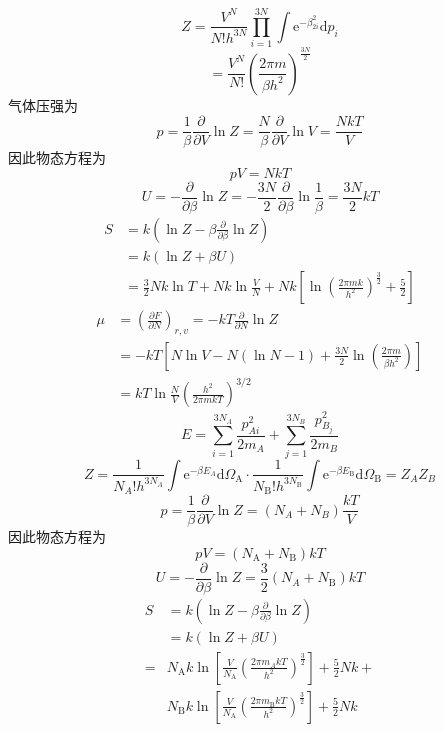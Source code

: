 \documentclass[UTF8,9pt]{ctexart}
\begin{document}
 $$Z 
=\frac{V^{N}}{N ! h^{3 N}} \prod_{i=1}^{3 N} \int \mathrm{e}^{-\beta_{2 i}^{2}} \mathrm{d} p_{i}
 $$$$ 
 =\frac{V^{N}}{N !}\left(\frac{2 \pi m}{\beta h^{2}}\right)^{\frac{3 N}{2}}
  $$
  气体压强为
  $$ 
p=\frac{1}{\beta} \frac{\partial}{\partial V} \ln Z=\frac{N}{\beta} \frac{\partial}{\partial V} \ln V=\frac{N k T}{V}
 $$因此物态方程为$$ 
 p V=N k T
  $$
  $$ 
U=-\frac{\partial}{\partial \beta} \ln Z=-\frac{3 N}{2} \frac{\partial}{\partial \beta} \ln \frac{1}{\beta}=\frac{3 N}{2} k T
 $$$$ 
\begin{aligned} S &=k\left(\ln Z-\beta \frac{\partial}{\partial \beta} \ln Z\right) \\ &=k(\ln Z+\beta U) \\ &=\frac{3}{2} N k \ln T+N k \ln \frac{V}{N}+N k\left[\ln \left(\frac{2 \pi m k}{h^{2}}\right)^{\frac{3}{2}}+\frac{5}{2}\right] \end{aligned}
 $$$$ 
\begin{aligned} \mu &=\left(\frac{\partial F}{\partial N}\right)_{r, v}=-k T \frac{\partial}{\partial N} \ln Z \\ &=-k T\left[N \ln V-N(\ln N-1)+\frac{3 N}{2} \ln \left(\frac{2 \pi m}{\beta h^{2}}\right)\right] \\ &=k T \ln \frac{N}{V}\left(\frac{h^{2}}{2 \pi m k T}\right)^{3 / 2} \end{aligned}
 $$
 $$ 
E=\sum_{i=1}^{3 N_{A}} \frac{p_{A i}^{2}}{2 m_{A}}+\sum_{j=1}^{3 N_{B}} \frac{p_{B_{j}}^{2}}{2 m_{B}}
 $$
 $$Z 
=\frac{1}{N_{A} ! h^{3 N_{A}}} \int \mathrm{e}^{-\beta E_{A}} \mathrm{d} \Omega_{\mathrm{A}} \cdot \frac{1}{N_{\mathrm{B}} ! h^{3 N_{\mathrm{B}}}} \int \mathrm{e}^{-\beta E_{\mathrm{B}}} \mathrm{d} \Omega_{\mathrm{B}} = Z_AZ_B
 $$
 $$ 
p=\frac{1}{\beta} \frac{\partial}{\partial V} \ln Z=\left(N_{A}+N_{B}\right) \frac{k T}{V}
 $$因此物态方程为
 $$ 
p V=\left(N_{\mathrm{A}}+N_{\mathrm{B}}\right) k T
 $$$$ 
 U=-\frac{\partial}{\partial \beta} \ln Z=\frac{3}{2}\left(N_{A}+N_{\mathrm{B}}\right) k T
  $$$$ 
\begin{aligned} S &=k\left(\ln Z-\beta \frac{\partial}{\partial \beta} \ln Z\right) \\ &=k(\ln Z+\beta U) \\=& N_{\mathrm{A}} k \ln \left[\frac{V}{N_{\mathrm{A}}}\left(\frac{2 \pi m_{A} k T}{h^{2}}\right)^{\frac{3}{2}}\right]+\frac{5}{2} N k+\\ & N_{\mathrm{B}} k \ln \left[\frac{V}{N_{\mathrm{A}}}\left(\frac{2 \pi m_{\mathrm{B}} k T}{h^{2}}\right)^{\frac{3}{2}}\right]+\frac{5}{2} N k \end{aligned}
 $$
\end{document}
